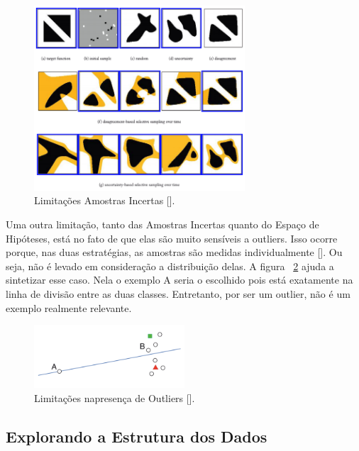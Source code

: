 \begin{figure}
  \centering
  \includegraphics[width=0.7\textwidth]{figures/limitations_incertas.png}
  \caption{Limitações Amostras Incertas [\cite{settles2014active}].}
  \label{fig:limitations_incertas}
\end{figure}

Uma outra limitação, tanto das Amostras Incertas quanto do Espaço de Hipóteses, está no fato de que elas são muito sensíveis a outliers. Isso ocorre porque, nas duas estratégias, as amostras são medidas individualmente [\cite{settles2014active}]. Ou seja, não é levado em consideração a distribuição delas. A figura ~\ref{fig:limitations_outliers} ajuda a sintetizar esse caso. Nela o exemplo A seria o escolhido pois está exatamente na linha de divisão entre as duas classes. Entretanto, por ser um outlier, não é um exemplo realmente relevante. 


\begin{figure}
  \centering
  \includegraphics[width=0.5\textwidth]{figures/limitations_outliers.png}
  \caption{Limitações napresença de Outliers [\cite{settles2014active}].}
  \label{fig:limitations_outliers}
\end{figure}

 \subsection{Explorando a Estrutura dos Dados} 
\label{sec:explorando_estrutura_dados }

